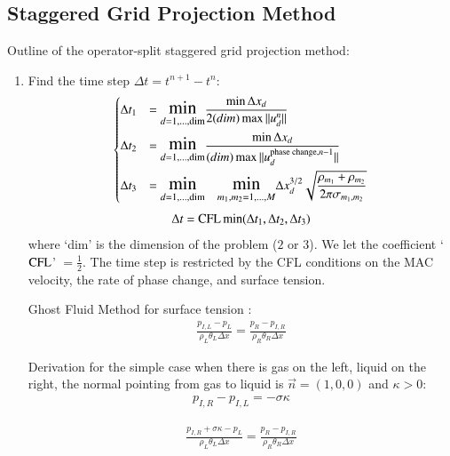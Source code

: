 \documentclass[preprint,12pt]{Definitions/elsarticle}
\newcommand{\tn}{\textnormal}
\begin{document}
\subsection{Staggered Grid Projection Method}
Outline of the operator-split staggered grid projection method:
\begin{enumerate}
	\item Find the time step $\Delta t=t^{n+1}-t^{n}$:
	\begin{equation}
	\begin{dcases}
	\Delta t_{1}&=\mathlarger{\mathlarger{\min}}_{d=1,\ldots,\tn{dim}}
	\frac{\min \Delta x_{d}}{2 (dim) \max||u_{d}^{n}||} \\	
	\Delta t_{2}&=\mathlarger{\mathlarger{\min}}_{d=1,\ldots,\tn{dim}}
	\frac{\min\Delta x_{d}}{(dim)\max||u_{d}^{\tn{phase change},n-1}||} \\
	\Delta t_{3}&=\mathlarger{\mathlarger{\min}}_{d=1,\ldots,\tn{dim}} \quad
	\mathlarger{\mathlarger{\min}}_{m_1,m_2=1,\ldots,M}
	\Delta x_{d}^{3/2}
	\sqrt{\frac{\rho_{m_1}+\rho_{m_2}}
		{2\pi\sigma_{m_1,m_2}}} 
	\end{dcases}
	\label{stiffconstraint}
	\end{equation}
	\begin{equation}
	\Delta t = \tn{CFL} \min(\Delta t_{1},\Delta t_{2},\Delta t_{3})
	\end{equation}
	where `dim' is the dimension of the problem ($2$ or $3$). We let the coefficient `$\tn{CFL}$' $= \frac{1}{2}$. The time step is restricted by the CFL conditions on the MAC velocity, the rate of phase change, and surface tension.\\



\newpage
\par\noindent
Ghost Fluid Method for surface tension \cite{kang2000boundary}:
\begin{eqnarray*}
\frac{p_{I,L}-p_{L}}{\rho_{L}\theta_{L}\Delta x}=
\frac{p_{R}-p_{I,R}}{\rho_{R}\theta_{R}\Delta x}
\end{eqnarray*}
\par\noindent
Derivation for the simple case when there is
gas on the left, liquid on the right, the normal pointing from gas to liquid is
$\vec{n}=(1,0,0)$ and $\kappa>0$:
\begin{eqnarray*}
p_{I,R}-p_{I,L}=-\sigma\kappa 
\end{eqnarray*}

\begin{eqnarray*}
\frac{p_{I,R}+\sigma\kappa-p_{L}}{\rho_{L}\theta_{L}\Delta x}=
\frac{p_{R}-p_{I,R}}{\rho_{R}\theta_{R}\Delta x}
\end{eqnarray*}


\end{enumerate}
\end{document}
